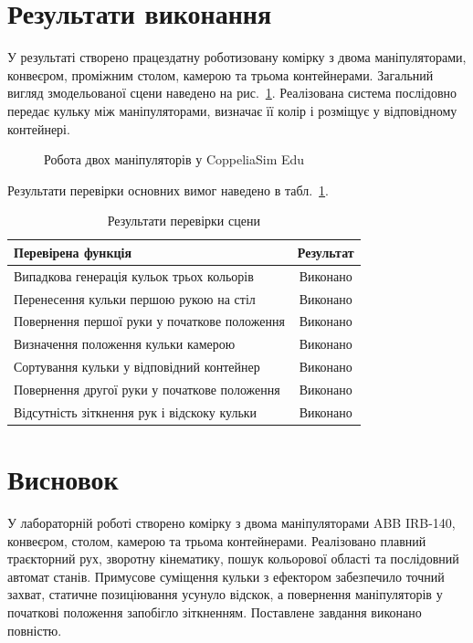 \documentclass[12pt,a4paper]{article}
\begin{document}
\section{Результати виконання}

У результаті створено працездатну роботизовану комірку з двома
маніпуляторами, конвеєром, проміжним столом, камерою та трьома контейнерами.
Загальний вигляд змодельованої сцени наведено на
рис.~\ref{fig:scene-result}. Реалізована система послідовно передає кульку
між маніпуляторами, визначає її колір і розміщує у відповідному контейнері.

\begin{figure}[H]
  \centering
  \caption{Робота двох маніпуляторів у CoppeliaSim Edu}
  \label{fig:scene-result}
\end{figure}

Результати перевірки основних вимог наведено в
табл.~\ref{tab:results}.

\begin{table}[H]
  \centering
  \renewcommand{\arraystretch}{1.08}
  \begin{tabular}{|p{}|c|}
    \hline
    \textbf{Перевірена функція} & \textbf{Результат} \\
    \hline
    Випадкова генерація кульок трьох кольорів & Виконано \\ \hline
    Перенесення кульки першою рукою на стіл & Виконано \\ \hline
    Повернення першої руки у початкове положення & Виконано \\ \hline
    Визначення положення кульки камерою & Виконано \\ \hline
    Сортування кульки у відповідний контейнер & Виконано \\ \hline
    Повернення другої руки у початкове положення & Виконано \\ \hline
    Відсутність зіткнення рук і відскоку кульки & Виконано \\ \hline
  \end{tabular}
  \caption{Результати перевірки сцени}
  \label{tab:results}
\end{table}

\section{Висновок}

У лабораторній роботі створено комірку з двома маніпуляторами ABB IRB-140,
конвеєром, столом, камерою та трьома контейнерами. Реалізовано плавний
траєкторний рух, зворотну кінематику, пошук кольорової області та послідовний
автомат станів. Примусове суміщення кульки з ефектором забезпечило точний
захват, статичне позиціювання усунуло відскок, а повернення маніпуляторів у
початкові положення запобігло зіткненням. Поставлене завдання виконано
повністю.
\end{document}
